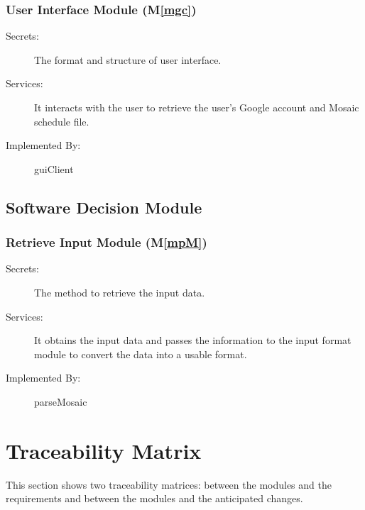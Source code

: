 \documentclass[12pt, titlepage]{article}
\newcommand{\mref}[1]{M\ref{#1}}
\begin{document}
\subsubsection{User Interface Module (\mref{mgc})}
\begin{description}
\item[Secrets:]The format and structure of user interface.
\item[Services:]It interacts with the user to retrieve the user's Google account and Mosaic schedule file.
\item[Implemented By:] guiClient
\end{description}

\subsection{Software Decision Module}
\subsubsection{Retrieve Input Module (\mref{mpM})}
\begin{description}
\item[Secrets:]The method to retrieve the input data.
\item[Services:]It obtains the input data and passes the information to the input format module to convert the data into a usable format.
\item[Implemented By:] parseMosaic
\end{description}

\section{Traceability Matrix} \label{SecTM}

This section shows two traceability matrices: between the modules and the
requirements and between the modules and the anticipated changes.
\end{document}
